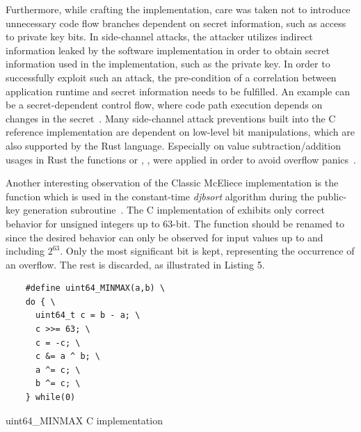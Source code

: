 \documentclass[11pt,
  oneside,openany,    %
]{scrreprt}
\begin{document}
Furthermore, while crafting the implementation, care was taken not to introduce unnecessary code flow branches dependent on secret information, such as access to private key bits. In side-channel attacks, the attacker utilizes indirect information leaked by the software implementation in order to obtain secret information used in the implementation, such as the private key. In order to successfully exploit such an attack, the pre-condition of a correlation between application runtime and secret information needs to be fulfilled. An example can be a secret-dependent control flow, where code path execution depends on changes in the secret~\cite{sideChannelsInCrypto}. Many side-channel attack preventions built into the C reference implementation are dependent on low-level bit manipulations, which are also supported by the Rust language. Especially on value subtraction/addition usages in Rust the functions  or , ,  were applied in order to avoid overflow panics~\cite{rust_methods}.

Another interesting observation of the Classic McEliece implementation is the  function which is used in the constant-time \textit{djbsort} algorithm during the public-key generation  subroutine~\cite{djb-sort, classicMcElieceSubmission3}. The C implementation of  exhibits only correct behavior for unsigned integers up to 63-bit. The function should be renamed to  since the desired behavior can only be observed for input values up to and including $2^{63}$. Only the most significant bit is kept, representing the occurrence of an overflow. The rest is discarded, as illustrated in Listing 5.

\begin{listing}[H]
\centering
\begin{verbatim}
    #define uint64_MINMAX(a,b) \
    do { \
      uint64_t c = b - a; \
      c >>= 63; \
      c = -c; \
      c &= a ^ b; \
      a ^= c; \
      b ^= c; \
    } while(0)
\end{verbatim}
  \caption{uint64\_MINMAX C implementation}
  \label{list:uint64_minmax_C}
\end{listing}
\end{document}
